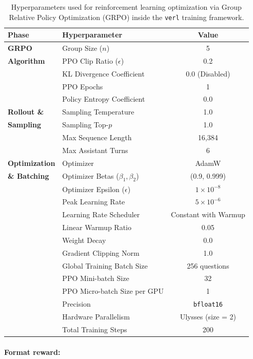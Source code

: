 \documentclass{article} %
\begin{document}
\begin{table}[!t]
\centering
\caption{Hyperparameters used for reinforcement learning optimization via Group Relative Policy Optimization (GRPO) inside the \texttt{verl} training framework.}
\label{tab:hyperparams-grpo}
\begin{tabular}{llc}
\toprule
\textbf{Phase} & \textbf{Hyperparameter} & \textbf{Value} \\
\midrule
\textbf{GRPO} 
& Group Size ($n$) & 5 \\
\textbf{Algorithm} 
& PPO Clip Ratio ($\epsilon$) & 0.2 \\
& KL Divergence Coefficient & 0.0 (Disabled) \\
& PPO Epochs & 1 \\
& Policy Entropy Coefficient & 0.0 \\
\midrule
\textbf{Rollout \&} 
& Sampling Temperature & 1.0 \\
\textbf{Sampling} 
& Sampling Top-$p$ & 1.0 \\
& Max Sequence Length & 16,384 \\
& Max Assistant Turns & 6 \\
\midrule
\textbf{Optimization} 
& Optimizer & AdamW \\
\textbf{\& Batching} 
& Optimizer Betas ($\beta_1, \beta_2$) & (0.9, 0.999) \\
& Optimizer Epsilon ($\epsilon$) & $1 \times 10^{-8}$ \\
& Peak Learning Rate & $5 \times 10^{-6}$ \\
& Learning Rate Scheduler & Constant with Warmup \\
& Linear Warmup Ratio & 0.05 \\
& Weight Decay & 0.0 \\
& Gradient Clipping Norm & 1.0 \\
& Global Training Batch Size & 256 questions \\
& PPO Mini-batch Size & 32 \\
& PPO Micro-batch Size per GPU & 1 \\
& Precision & \texttt{bfloat16} \\
& Hardware Parallelism & Ulysses (size = 2) \\
& Total Training Steps & 200 \\
\bottomrule
\end{tabular}
\end{table}



\paragraph{Format reward:}
\end{document}
